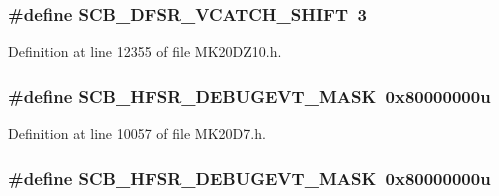 \subsubsection[{\texorpdfstring{S\+C\+B\+\_\+\+D\+F\+S\+R\+\_\+\+V\+C\+A\+T\+C\+H\+\_\+\+S\+H\+I\+FT}{SCB_DFSR_VCATCH_SHIFT}}]{\setlength{\rightskip}{0pt plus 5cm}\#define S\+C\+B\+\_\+\+D\+F\+S\+R\+\_\+\+V\+C\+A\+T\+C\+H\+\_\+\+S\+H\+I\+FT~3}\hypertarget{group___s_c_b___register___masks_gaa503bd566d848235828e742233b8ff20}{}\label{group___s_c_b___register___masks_gaa503bd566d848235828e742233b8ff20}


Definition at line 12355 of file M\+K20\+D\+Z10.\+h.

\subsubsection[{\texorpdfstring{S\+C\+B\+\_\+\+H\+F\+S\+R\+\_\+\+D\+E\+B\+U\+G\+E\+V\+T\+\_\+\+M\+A\+SK}{SCB_HFSR_DEBUGEVT_MASK}}]{\setlength{\rightskip}{0pt plus 5cm}\#define S\+C\+B\+\_\+\+H\+F\+S\+R\+\_\+\+D\+E\+B\+U\+G\+E\+V\+T\+\_\+\+M\+A\+SK~0x80000000u}\hypertarget{group___s_c_b___register___masks_ga2c38153f3a19482914090d9d1f1b848c}{}\label{group___s_c_b___register___masks_ga2c38153f3a19482914090d9d1f1b848c}


Definition at line 10057 of file M\+K20\+D7.\+h.

\subsubsection[{\texorpdfstring{S\+C\+B\+\_\+\+H\+F\+S\+R\+\_\+\+D\+E\+B\+U\+G\+E\+V\+T\+\_\+\+M\+A\+SK}{SCB_HFSR_DEBUGEVT_MASK}}]{\setlength{\rightskip}{0pt plus 5cm}\#define S\+C\+B\+\_\+\+H\+F\+S\+R\+\_\+\+D\+E\+B\+U\+G\+E\+V\+T\+\_\+\+M\+A\+SK~0x80000000u}\hypertarget{group___s_c_b___register___masks_ga2c38153f3a19482914090d9d1f1b848c}{}\label{group___s_c_b___register___masks_ga2c38153f3a19482914090d9d1f1b848c}


